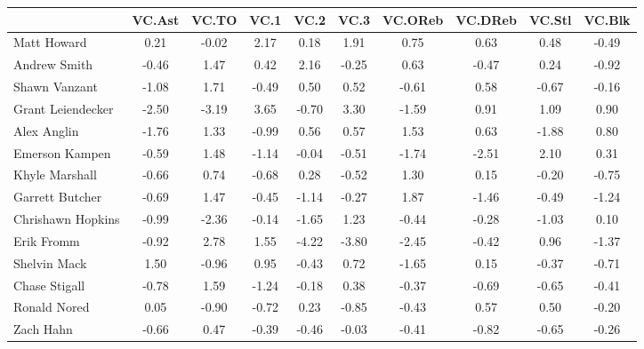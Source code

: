 \documentclass[10pt,letterpaper]{article}
\begin{document}
\begin{table}[ht]
\begin{center}
\begin{tabular}{lccccccccc}
  \hline
 & VC.Ast & VC.TO & VC.1 & VC.2 & VC.3 & VC.OReb & VC.DReb & VC.Stl & VC.Blk \\ 
  \hline
Matt Howard & 0.21 & -0.02 & 2.17 & 0.18 & 1.91 & 0.75 & 0.63 & 0.48 & -0.49 \\ 
  Andrew Smith & -0.46 & 1.47 & 0.42 & 2.16 & -0.25 & 0.63 & -0.47 & 0.24 & -0.92 \\ 
  Shawn Vanzant & -1.08 & 1.71 & -0.49 & 0.50 & 0.52 & -0.61 & 0.58 & -0.67 & -0.16 \\ 
  Grant Leiendecker & -2.50 & -3.19 & 3.65 & -0.70 & 3.30 & -1.59 & 0.91 & 1.09 & 0.90 \\ 
  Alex Anglin & -1.76 & 1.33 & -0.99 & 0.56 & 0.57 & 1.53 & 0.63 & -1.88 & 0.80 \\ 
  Emerson Kampen & -0.59 & 1.48 & -1.14 & -0.04 & -0.51 & -1.74 & -2.51 & 2.10 & 0.31 \\ 
  Khyle Marshall & -0.66 & 0.74 & -0.68 & 0.28 & -0.52 & 1.30 & 0.15 & -0.20 & -0.75 \\ 
  Garrett Butcher & -0.69 & 1.47 & -0.45 & -1.14 & -0.27 & 1.87 & -1.46 & -0.49 & -1.24 \\ 
  Chrishawn Hopkins & -0.99 & -2.36 & -0.14 & -1.65 & 1.23 & -0.44 & -0.28 & -1.03 & 0.10 \\ 
  Erik Fromm & -0.92 & 2.78 & 1.55 & -4.22 & -3.80 & -2.45 & -0.42 & 0.96 & -1.37 \\ 
  Shelvin Mack & 1.50 & -0.96 & 0.95 & -0.43 & 0.72 & -1.65 & 0.15 & -0.37 & -0.71 \\ 
  Chase Stigall & -0.78 & 1.59 & -1.24 & -0.18 & 0.38 & -0.37 & -0.69 & -0.65 & -0.41 \\ 
  Ronald Nored & 0.05 & -0.90 & -0.72 & 0.23 & -0.85 & -0.43 & 0.57 & 0.50 & -0.20 \\ 
  Zach Hahn & -0.66 & 0.47 & -0.39 & -0.46 & -0.03 & -0.41 & -0.82 & -0.65 & -0.26 \\ 
   \hline
\end{tabular}
\end{center}
\end{table}
\end{document}
